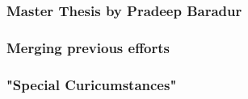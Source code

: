 		\subsubsection{Master Thesis by Pradeep Baradur}
		
		\subsubsection{Merging previous efforts}
		
		\subsubsection{"Special Curicumstances"}
		
